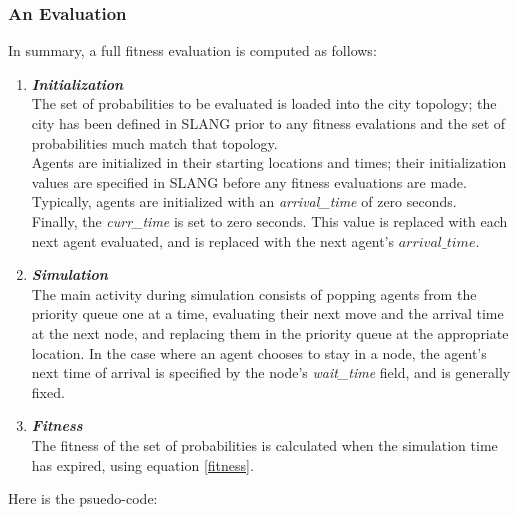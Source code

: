 \documentclass{sig-alternate-05-2015}
\begin{document}
			\subsubsection{An Evaluation}
				In summary, a full fitness evaluation is computed as follows:
				\begin{enumerate}
					\item \textbf{\textit{Initialization}}\\
					The set of probabilities to be evaluated is loaded into the city topology; the city has been defined in SLANG prior to any fitness evalations and the set of probabilities much match that topology.\\
					Agents are initialized in their starting locations and times; their initialization values are specified in SLANG before any fitness evaluations are made. Typically, agents are initialized with an \emph{arrival\_time} of zero seconds.\\
					Finally, the \emph{curr\_time} is set to zero seconds. This value is replaced with each next agent evaluated, and is replaced with the next agent's $arrival\_time$.
					\item \textbf{\textit{Simulation}}\\
					The main activity during simulation consists of popping agents from the priority queue one at a time, evaluating their next move and the arrival time at the next node, and replacing them in the priority queue at the appropriate location. In the case where an agent chooses to stay in a node, the agent's next time of arrival is specified by the node's \emph{wait\_time} field, and is generally fixed.
					\item \textbf{\textit{Fitness}}\\
					The fitness of the set of probabilities is calculated when the simulation time has expired, using equation \ref{fitness}.
				\end{enumerate}
			Here is the psuedo-code:
\end{document}
